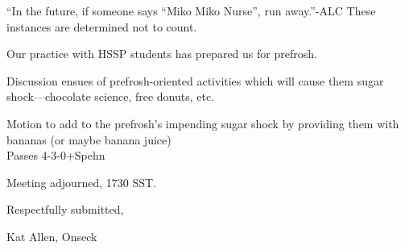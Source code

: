 \documentclass[10pt]{article}
\begin{document}
``In the future, if someone says ``Miko Miko Nurse'', run away.''-ALC
These instances are determined not to count.

Our practice with HSSP students has prepared us for prefrosh.

Discussion ensues of prefrosh-oriented activities which will cause
them sugar shock---chocolate science, free donuts, etc.

Motion to add to the prefrosh's impending sugar shock by providing
them with bananas (or maybe banana juice)\\
Passes 4-3-0+Spehn

\vspace{12pt}

\noindent
Meeting adjourned, 1730 SST.

\vspace{18pt}

\centerline{Respectfully submitted,}
\centerline{Kat Allen,  Onseck}
\end{document}
